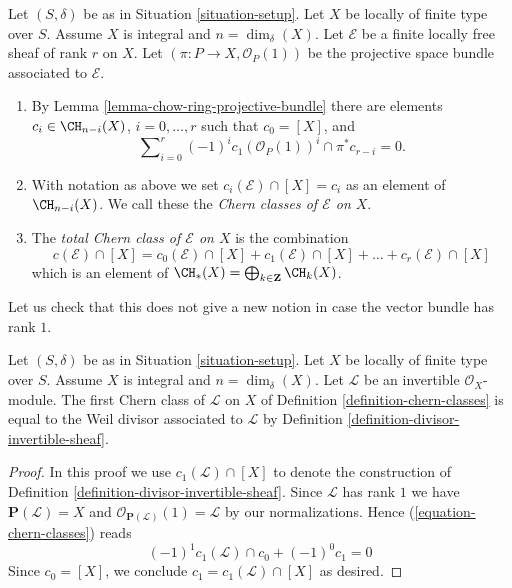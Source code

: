 \begin{definition}
\label{definition-chern-classes}
Let $(S, \delta)$ be as in Situation \ref{situation-setup}.
Let $X$ be locally of finite type over $S$.
Assume $X$ is integral and $n = \dim_\delta(X)$.
Let $\mathcal{E}$ be a finite locally free sheaf of rank $r$
on $X$. Let $(\pi : P \to X, \mathcal{O}_P(1))$ be the projective space
bundle associated to $\mathcal{E}$.
\begin{enumerate}
\item By Lemma \ref{lemma-chow-ring-projective-bundle} there are
elements $c_i \in \CH_{n - i}(X)$, $i = 0, \ldots, r$
such that $c_0 = [X]$, and
\begin{equation}
\label{equation-chern-classes}
\sum\nolimits_{i = 0}^r
(-1)^i c_1(\mathcal{O}_P(1))^i \cap \pi^*c_{r - i}
= 0.
\end{equation}
\item With notation as above we set
$c_i(\mathcal{E}) \cap [X] = c_i$
as an element of $\CH_{n - i}(X)$.
We call these the {\it Chern classes of $\mathcal{E}$ on $X$}.
\item The {\it total Chern class of $\mathcal{E}$ on $X$}
is the combination
$$
c({\mathcal E}) \cap [X] =
c_0({\mathcal E}) \cap [X]
+ c_1({\mathcal E}) \cap [X] + \ldots
+ c_r({\mathcal E}) \cap [X]
$$
which is an element of
$\CH_*(X) = \bigoplus_{k \in \mathbf{Z}} \CH_k(X)$.
\end{enumerate}
\end{definition}

\noindent
Let us check that this does not give a new notion in case the
vector bundle has rank $1$.

\begin{lemma}
\label{lemma-first-chern-class}
Let $(S, \delta)$ be as in Situation \ref{situation-setup}.
Let $X$ be locally of finite type over $S$.
Assume $X$ is integral and $n = \dim_\delta(X)$.
Let $\mathcal{L}$ be an invertible $\mathcal{O}_X$-module.
The first Chern class of $\mathcal{L}$ on $X$ of
Definition \ref{definition-chern-classes}
is equal to the Weil divisor associated to $\mathcal{L}$
by Definition \ref{definition-divisor-invertible-sheaf}.
\end{lemma}

\begin{proof}
In this proof we use $c_1(\mathcal{L}) \cap [X]$ to denote the
construction of Definition \ref{definition-divisor-invertible-sheaf}.
Since $\mathcal{L}$ has rank $1$ we have
$\mathbf{P}(\mathcal{L}) = X$ and
$\mathcal{O}_{\mathbf{P}(\mathcal{L})}(1) = \mathcal{L}$
by our normalizations. Hence (\ref{equation-chern-classes})
reads
$$
(-1)^1 c_1(\mathcal{L}) \cap c_0 + (-1)^0 c_1 = 0
$$
Since $c_0 = [X]$, we conclude $c_1 = c_1(\mathcal{L}) \cap [X]$
as desired.
\end{proof}

